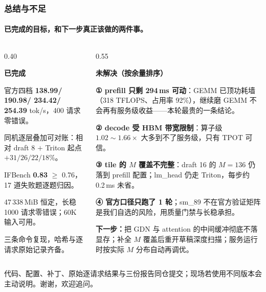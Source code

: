 \documentclass[aspectratio=169,10pt,UTF8]{beamer}
\newcommand{\NumCone}{138.99}
\newcommand{\NumCtwo}{190.98}
\newcommand{\NumCfour}{234.42}
\newcommand{\NumCeight}{254.39}
\newcommand{\NumIF}{0.83}
\newcommand{\NumVRAM}{47\,338}
\newcommand{\refnote}[1]{{\fontsize{7.4}{9.4}\selectfont\color{muted}#1}}
\newcommand{\chg}[1]{{\color{warn}#1}}
\newcommand{\hd}[2][9.8]{\par{\sffamily\bfseries\fontsize{#1}{11.2}\selectfont #2}\par
  \vspace{1pt}\noindent{\color{rule}\rule{\linewidth}{0.4pt}}\par\vspace{2.4pt}}
\newcommand{\body}[1]{\par{\fontsize{8.7}{11.3}\selectfont #1}\par}
\begin{document}
\begin{frame}[t]
  \frametitle{总结与不足}
  \framesubtitle{已完成的目标，和下一步真正该做的两件事。}

  \begin{columns}[T,onlytextwidth]
    \begin{column}{0.40\linewidth}
      \hd{已完成}
      \body{官方四档 \textbf{\NumCone / \NumCtwo / \NumCfour / \NumCeight} tok/s，400 请求零错误。\par
      \vspace{3pt}
      同机逐层叠加可对账：相对 draft 8 $+$ Triton 起点 $+31/26/22/18\%$。\par
      \vspace{3pt}
      IFBench \textbf{\NumIF} $\ge$ 0.76，17 道失败题逐题归因。\par
      \vspace{3pt}
      \NumVRAM\,MiB 恒定，长稳 1000 请求零错误；60K 输入可用。\par
      \vspace{3pt}
      三条命令复现，哈希与逐请求原始记录齐备。}
    \end{column}
    \hfill
    \begin{column}{0.55\linewidth}
      \hd{未解决（按余量排序）}
      \body{\textbf{① prefill 只剩 294\,ms 可动}：GEMM 已顶功耗墙（318 TFLOPS、占用率 92\%），\chg{继续磨 GEMM 不会再有服务级收益}——本轮最贵的一条结论。\par
      \vspace{2pt}
      \textbf{② decode 受 HBM 带宽限制}：算子级 $1.02\sim1.66\times$ 大多到不了服务级，只有 TPOT 可信。\par
      \vspace{2pt}
      \textbf{③ tile 的 $M$ 覆盖不完整}：draft 16 的 $M=136$ 仍落到 prefill 配置；lm\_head 仍走 Triton，每步约 0.2\,ms 未省。\par
      \vspace{3pt}
      \textbf{④ 官方口径只跑了 1 轮}；sm\_89 不在官方验证矩阵是我们自选的风险，用质量门禁与长稳承担。\par}
      \vspace{4pt}
      \body{\textbf{下一步：}把 GDN 与 attention 的中间缓冲彻底不落显存；补全 $M$ 覆盖后重开草稿深度扫描；服务运行时按实际 $M$ 分布自动再调优。\par}
    \end{column}
  \end{columns}

  \vspace{2pt}
  \noindent{\color{rule}\rule{\linewidth}{0.4pt}}\par
  \vspace{2pt}
  {\refnote{代码、配置、补丁、原始逐请求结果与三份报告同仓提交；现场若使用不同版本会主动说明。\hfill 谢谢，欢迎追问。}}

\end{frame}
\end{document}

